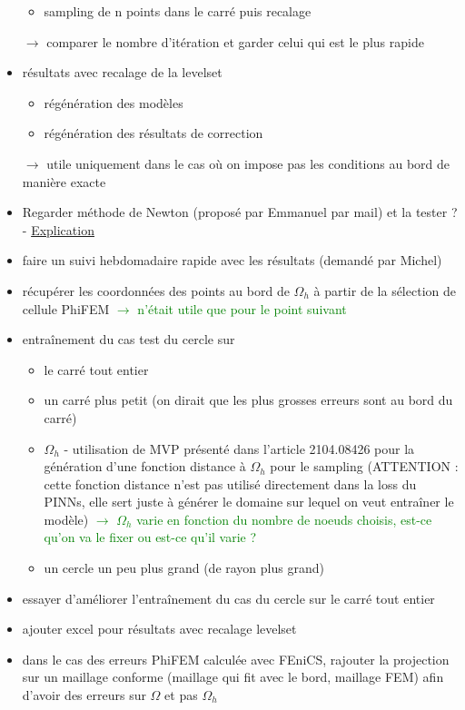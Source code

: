 \begin{itemize}[label=$\square$]
\begin{itemize}[label=\LARGE $\circ$]
		\item sampling de n points dans le carré puis recalage
	\end{itemize}
	$\rightarrow$ comparer le nombre d'itération et garder celui qui est le plus rapide
	\item résultats avec recalage de la levelset
	\begin{itemize}[label=\LARGE $\circ$]
		\item[\sdone] régénération des modèles 
		\item régénération des résultats de correction
	\end{itemize}
	$\rightarrow$ utile uniquement dans le cas où on impose pas les conditions au bord de manière exacte
	\item Regarder méthode de Newton (proposé par Emmanuel par mail) et la tester ? - \href{https://www.mathweb.fr/euclide/methode-de-newton/}{Explication}
	\item[\done] faire un suivi hebdomadaire rapide avec les résultats (demandé par Michel)
	\item[\wontfix] récupérer les coordonnées des points au bord de $\Omega_h$ à partir de la sélection de cellule PhiFEM \textcolor{Green}{$\rightarrow$ n'était utile que pour le point suivant}
	\item entraînement du cas test du cercle sur 
	\begin{itemize}[label=\LARGE $\circ$]
		\item[\sdone] le carré tout entier
		\item un carré plus petit (on dirait que les plus grosses erreurs sont au bord du carré)
		\item[\swontfix] $\Omega_h$ - utilisation de MVP présenté dans l'article 2104.08426 pour la génération d'une fonction distance à $\Omega_h$ pour le sampling (ATTENTION : cette fonction distance n'est pas utilisé directement dans la loss du PINNs, elle sert juste à générer le domaine sur lequel on veut entraîner le modèle) \textcolor{Green}{$\rightarrow$ $\Omega_h$ varie en fonction du nombre de noeuds choisis, est-ce qu'on va le fixer ou est-ce qu'il varie ?}
		\item un cercle un peu plus grand (de rayon plus grand) 
	\end{itemize}
	\item essayer d'améliorer l'entraînement du cas du cercle sur le carré tout entier
	\item ajouter excel pour résultats avec recalage levelset
	\item[\done] dans le cas des erreurs PhiFEM calculée avec FEniCS, rajouter la projection sur un maillage conforme (maillage qui fit avec le bord, maillage FEM) afin d'avoir des erreurs sur $\Omega$ et pas $\Omega_h$

\end{itemize}
